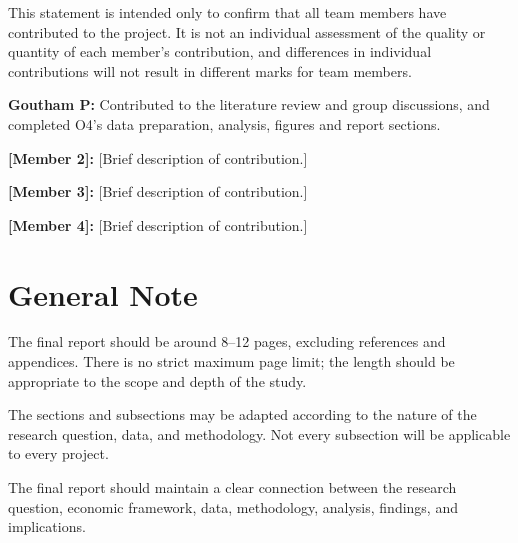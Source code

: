 \documentclass[12pt,a4paper]{article}
\newcommand{\templatebullet}[1]{\par\noindent\textbullet\hspace{5.88pt}#1\par}
\begin{document}
This statement is intended only to confirm that all team members have contributed to the project. It is not an individual assessment of the quality or quantity of each member's contribution, and differences in individual contributions will not result in different marks for team members.
\templatebullet{\textbf{Goutham P:} Contributed to the literature review and group discussions, and completed O4's data preparation, analysis, figures and report sections.}
\templatebullet{\textbf{[Member 2]:} [Brief description of contribution.]}
\templatebullet{\textbf{[Member 3]:} [Brief description of contribution.]}
\templatebullet{\textbf{[Member 4]:} [Brief description of contribution.]}

\newpage
\section*{General Note}
The final report should be around 8--12 pages, excluding references and appendices. There is no strict maximum page limit; the length should be appropriate to the scope and depth of the study.

The sections and subsections may be adapted according to the nature of the research question, data, and methodology. Not every subsection will be applicable to every project.

The final report should maintain a clear connection between the research question, economic framework, data, methodology, analysis, findings, and implications.
\end{document}
